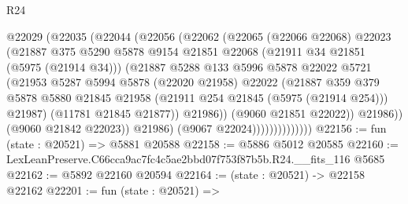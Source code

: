\begin{lexlean}{R24}
\begin{coremodule}
                            @22029
                              (@22035
                                (@22044
                                  (@22056
                                    (@22062
                                      (@22065
                                        (@22066 @22068)
                                        @22023
                                        (@21887
                                          @375
                                          @5290
                                          @5878
                                          @9154
                                          @21851
                                          @22068
                                          (@21911 @34 @21851 (@5975 (@21914 @34)))
                                          (@21887
                                            @5288
                                            @133
                                            @5996
                                            @5878
                                            @22022
                                            @5721
                                            (@21953
                                              @5287
                                              @5994
                                              @5878
                                              (@22020 @21958)
                                              @22022
                                              (@21887
                                                @359
                                                @379
                                                @5878
                                                @5880
                                                @21845
                                                @21958
                                                (@21911 @254 @21845 (@5975 (@21914 @254)))
                                                @21987)
                                              (@11781 @21845 @21877))
                                            @21986))
                                        (@9060 @21851 @22022))
                                      @21986))
                                  (@9060 @21842 @22023))
                                @21986)
                              (@9067 @22024))))))))))))))
@22156 := fun (state : @20521) => @5881 @20588
@22158 := @5886 @5012 @20585
@22160 := LexLeanPreserve.C66cca9ac7fc4c5ae2bbd07f753f87b5b.R24.__fits_116 @5685
@22162 := @5892 @22160 @20594
@22164 := (state : @20521) -> @22158 @22162
@22201 := fun (state : @20521) =>

\end{coremodule}
\end{lexlean}
